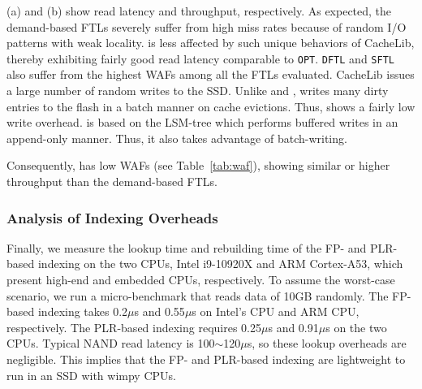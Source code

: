 (a) and (b) show read latency and
throughput, respectively.  As expected, the demand-based FTLs severely suffer
from high miss rates because of random I/O patterns with weak locality.
\texttt{\ours{}} is less affected by such unique behaviors of CacheLib, thereby
exhibiting fairly good read latency comparable to \texttt{OPT}.  
\texttt{DFTL} and \texttt{SFTL} also
suffer from the highest WAFs among all the FTLs evaluated.  CacheLib issues a
large number of random writes to the SSD.  
Unlike \DFTL{} and \SFTL{}, 
\TPFTL{} writes many dirty entries to the flash in a batch manner on cache evictions.
Thus, \TPFTL{} shows a fairly low write overhead. 
\texttt{\ours{}} is based on the LSM-tree
which performs buffered writes in an append-only manner.
Thus, it also takes advantage of batch-writing.

Consequently, \texttt{\ours{}} has low WAFs (see Table~\ref{tab:waf}),
showing similar or higher throughput than the demand-based FTLs.

\subsubsection{Analysis of Indexing Overheads}
Finally, we measure the lookup time and rebuilding time of 
the FP- and PLR-based indexing on the two CPUs,
Intel i9-10920X and ARM Cortex-A53, which present high-end and 
embedded CPUs, respectively.
To assume the worst-case scenario, 
we run a micro-benchmark that reads data of 10GB randomly.
The FP-based indexing takes 0.2$\mu$s and 0.55$\mu$s on
Intel's CPU and ARM CPU, respectively.
The PLR-based indexing requires 0.25$\mu$s and 0.91$\mu$s 
on the two CPUs.
Typical NAND read latency is 100$\sim$120$\mu$s, so 
these lookup overheads are negligible. 
This implies that the FP- and PLR-based indexing are lightweight 
to run in an SSD with wimpy CPUs.

